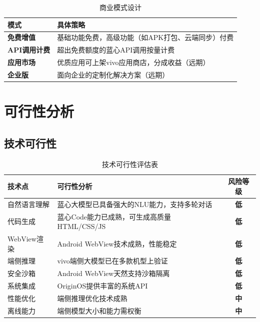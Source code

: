 \documentclass[a4paper,12pt]{ctexart}
\newcommand{\highlight}[1]{\textcolor{vivoblue}{\textbf{#1}}}
\begin{document}
\begin{table}[H]
    \centering
    \caption{商业模式设计}
    \begin{tabularx}{\textwidth}{|l|X|}
        \hline
        \textbf{模式} & \textbf{具体策略} \\
        \hline
        \highlight{免费增值} & 基础功能免费，高级功能（如APK打包、云端同步）付费 \\
        \hline
        \highlight{API调用计费} & 超出免费额度的蓝心API调用按量计费 \\
        \hline
        \highlight{应用市场} & 优质应用可上架vivo应用商店，分成收益（远期） \\
        \hline
        \highlight{企业版} & 面向企业的定制化解决方案（远期） \\
        \hline
    \end{tabularx}
\end{table}

\section{可行性分析}

\subsection{技术可行性}

\begin{table}[H]
    \centering
    \caption{技术可行性评估表}
    \begin{tabularx}{\textwidth}{|l|X|c|}
        \hline
        \textbf{技术点} & \textbf{可行性分析} & \textbf{风险等级} \\
        \hline
        自然语言理解 & 蓝心大模型已具备强大的NLU能力，支持多轮对话 & \highlight{低} \\
        \hline
        代码生成 & 蓝心Code能力已成熟，可生成高质量HTML/CSS/JS & \highlight{低} \\
        \hline
        WebView渲染 & Android WebView技术成熟，性能稳定 & \highlight{低} \\
        \hline
        端侧推理 & vivo端侧大模型已在多款机型上验证 & \highlight{低} \\
        \hline
        安全沙箱 & Android WebView天然支持沙箱隔离 & \highlight{低} \\
        \hline
        系统集成 & OriginOS提供丰富的系统API & \highlight{低} \\
        \hline
        性能优化 & 端侧推理优化技术成熟 & \highlight{中} \\
        \hline
        离线能力 & 端侧模型大小和能力需权衡 & \highlight{中} \\
        \hline
    \end{tabularx}
\end{table}
\end{document}
